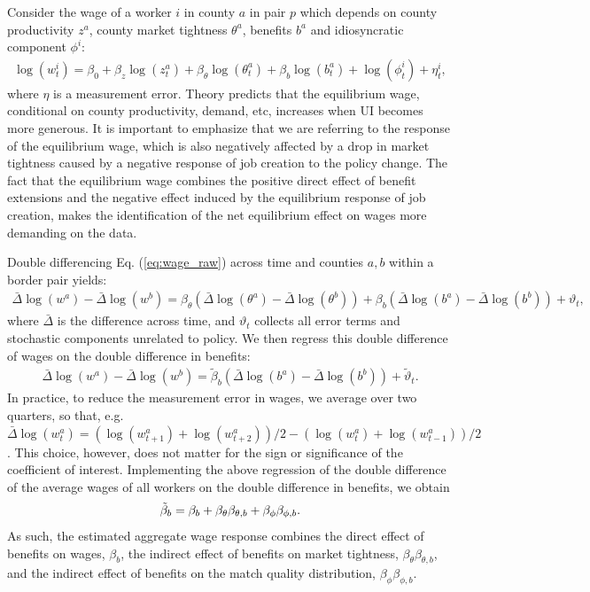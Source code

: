 \documentclass[12pt]{article}
\newcommand{\1}{\mathbf{1}}
\newcommand{\beq}{\begin{eqnarray}}
\newcommand{\eeq}{\end{eqnarray}}
\begin{document}
Consider the wage of a worker $i$ in county $a$ in pair $p$ which depends on county productivity $z^a$, county market tightness $\theta^a$, benefits $b^a$ and idiosyncratic component $\phi^i$:
\beq \label{eq:wage_raw}
\log (w_t^i) = \beta_0 + \beta_z \log(z_t^a) + \beta_{\theta} \log(\theta_t^a) + \beta_b \log(b_t^a) + \log(\phi_t^i) + \eta_t^i,
\eeq
where $\eta$ is a measurement error.
Theory predicts that the equilibrium wage, conditional on county productivity, demand, etc, increases when UI becomes more generous. It is important to emphasize that we are referring to the response of the equilibrium wage, which is also negatively affected  by a drop in market tightness caused by a negative response of job creation to the policy change. The fact that the equilibrium wage combines the positive direct effect of benefit extensions and the negative effect induced by the equilibrium response of job creation, makes the identification of the net equilibrium effect on wages more demanding on the data.

Double differencing Eq. (\ref{eq:wage_raw}) across time and counties $a,b$ within a border pair yields:
\beq \label{eq:wage_thetab}
\bar{\Delta} \log(w^a) - \bar{\Delta} \log(w^b)
=  \beta_{\theta} (\bar{\Delta} \log(\theta^a) - \bar{\Delta}\log(\theta^b))
+ \beta_b (\bar{\Delta}\log(b^a) - \bar{\Delta}\log(b^b)) + \vartheta_t,
\eeq
where $\bar{\Delta}$ is the difference across time, and $\vartheta_t$ collects all error terms and stochastic components unrelated to policy. We then regress this double difference of wages on the double difference in benefits:
\beq \label{eq:wageequation_estimate}
\bar{\Delta}\log(w^a) - \bar{\Delta}\log(w^b)
=\tilde{\beta}_b (\bar{\Delta}\log(b^a) - \bar{\Delta}\log(b^b)) + \tilde{\vartheta}_t.
\eeq
In practice, to reduce the measurement error in wages, we average over two quarters, so that, e.g. $\bar{\Delta}\log(w^a_t) = (\log (w_{t+1}^a)+\log (w_{t+2}^a))/2 - (\log (w_{t}^a)+\log (w_{t-1}^a))/2$. This choice, however, does not matter for the sign or significance of the coefficient of interest.  Implementing the above regression of the double difference of the average wages of all workers on the double difference in benefits, we obtain
\beq
\tilde{\beta}_b = \beta_b + \beta_{\theta} \beta_{\theta,b} + \beta_{\phi} \beta_{\phi,b}. \notag
\eeq
As such, the estimated aggregate wage response combines the direct effect of benefits on wages, $\beta_b$, the indirect effect of benefits on market tightness, $\beta_{\theta} \beta_{\theta,b}$, and the indirect effect of benefits on the match quality distribution, $\beta_{\phi} \beta_{\phi,b}$.
\end{document}
